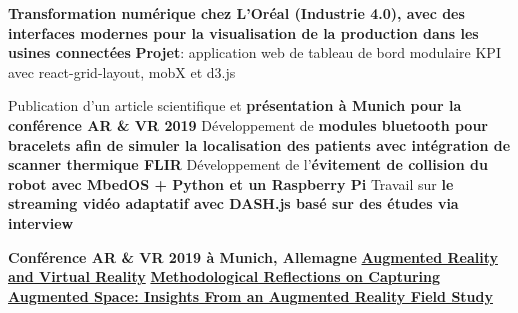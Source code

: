 \documentclass[10pt,a4paper,ragged2e,withhyper]{altacv}
\begin{document}
\divider

\vspace{-.25\baselineskip}
\textbf{\footnotesize{Transformation numérique chez L'Oréal (Industrie 4.0), avec des interfaces modernes pour la visualisation de la production dans les usines connectées}}
\textbf{Projet}: application web de tableau de bord modulaire KPI avec react-grid-layout, mobX et d3.js

\newpage
{}
\begin{paracol}{2}

Publication d'un article scientifique et \textbf{présentation à Munich pour la conférence AR \& VR 2019}
\smallbreak
\divider
{}
Développement de \textbf{modules bluetooth pour bracelets afin de simuler la localisation des patients avec intégration de scanner thermique FLIR}
\smallbreak
\divider
{}
Développement de l'\textbf{évitement de collision du robot avec MbedOS + Python et un Raspberry Pi}
\smallbreak
\divider
{}
Travail sur \textbf{le streaming vidéo adaptatif avec DASH.js basé sur des études via interview}

\medskip
{}
\smallbreak
\textbf{Conférence AR \& VR 2019 à Munich, Allemagne}
\smallbreak
\smallbreak
{}
\smallbreak
\href{https://doi.org/10.1007/978-3-030-37869-1}{\textbf{Augmented Reality and Virtual Reality}}
\smallbreak
\href{https://www.cogitatiopress.com/mediaandcommunication/article/view/5316/2797}{\textbf{Methodological Reflections on Capturing Augmented Space: Insights From an Augmented Reality Field Study}}



\end{paracol}
\end{document}
